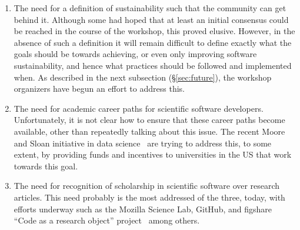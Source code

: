 \documentclass[11pt, oneside]{amsart}
\begin{document}
\begin{enumerate}
\item The need for a definition of sustainability such that the
community can get behind it. Although some had hoped that at least an
initial consensus could be reached in the course of the workshop, this
proved elusive. However, in the absence of such a definition it will
remain difficult to define exactly what the goals should be towards
achieving, or even only improving software sustainability, and hence
what practices should be followed and implemented when. As described
in the next subsection (\S\ref{sec:future}), the workshop organizers have begun an effort
to address this.

\item The need for academic
career paths for scientific software developers.  
Unfortunately, it is not clear how to ensure that these career paths become available,
other than repeatedly talking about this issue. The recent Moore and Sloan initiative
in data science~\cite{moore_sloan} are trying to address this, to some extent, by providing funds and
incentives to universities in the US that work towards this goal.

%
%
%

\item The need for recognition of scholarship in scientific software over research 
articles. This need probably is the most addressed of the three, today, with
efforts underway such as the Mozilla Science Lab, GitHub, and figshare
``Code as a research object'' project~\cite{code_as_a_research_object} among others.

\end{enumerate}

\end{document}

